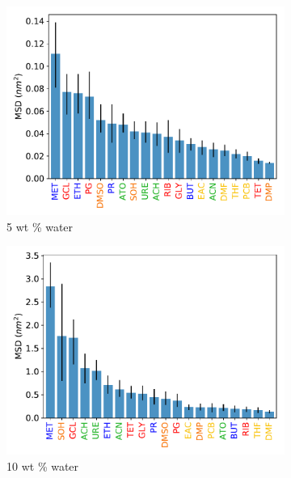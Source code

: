 \documentclass{article}
\begin{document}
  \begin{figure}
  \centering
  \vspace{-0.4cm}
  \begin{subfigure}{0.45\linewidth}
  \includegraphics[width=\linewidth]{all_5wt_tamsds.pdf}
  \caption{5 wt \% water}\label{fig:all_msds_5wt}
  \end{subfigure}
  \begin{subfigure}{0.45\linewidth}
  \includegraphics[width=\linewidth]{all_10wt_tamsds.pdf}
  \caption{10 wt \% water}\label{fig:all_msds_10wt}
  \end{subfigure}
  \begin{subfigure}{0.45\linewidth}

\end{subfigure}
\end{figure}
\end{document}
